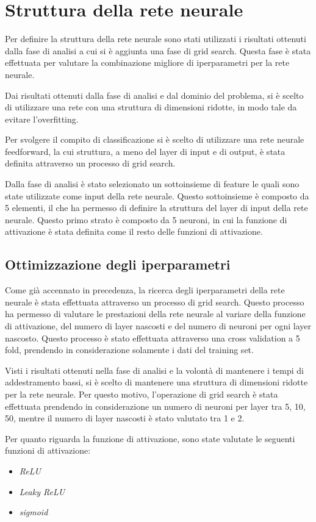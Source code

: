 \section{Struttura della rete neurale}
Per definire la struttura della rete neurale sono stati utilizzati i risultati
ottenuti dalla fase di analisi a cui si è aggiunta una fase di grid search. Questa
fase è stata effettuata per valutare la combinazione migliore di iperparametri
per la rete neurale.

Dai risultati ottenuti dalla fase di analisi e dal dominio del problema, si è
scelto di utilizzare una rete con una struttura di dimensioni ridotte, in modo
tale da evitare l'overfitting.

Per svolgere il compito di classificazione si è scelto di utilizzare una rete
neurale feedforward, la cui struttura, a meno del layer di input e di output, è
stata definita attraverso un processo di grid search.

Dalla fase di analisi è stato selezionato un sottoinsieme di feature le quali
sono state utilizzate come input della rete neurale. Questo sottoinsieme è
composto da 5 elementi, il che ha permesso di definire la struttura del layer di
input della rete neurale. Questo primo strato è composto da 5 neuroni, in cui la
funzione di attivazione è stata definita come il resto delle funzioni di attivazione.
\subsection*{Ottimizzazione degli iperparametri}
Come già accennato in precedenza, la ricerca degli iperparametri della rete neurale
è stata effettuata attraverso un processo di grid search. Questo processo ha
permesso di valutare le prestazioni della rete neurale al variare della funzione
di attivazione, del numero di layer nascosti e del numero di neuroni per ogni
layer nascosto. Questo processo è stato effettuata attraverso una cross
validation a 5 fold, prendendo in considerazione solamente i dati del training set.

Visti i risultati ottenuti nella fase di analisi e la volontà di mantenere i
tempi di addestramento bassi, si è scelto di mantenere una struttura di dimensioni
ridotte per la rete neurale. Per questo motivo, l'operazione di grid search è 
stata effettuata prendendo in considerazione un numero di neuroni per layer 
tra 5, 10, 50, mentre il numero di layer nascosti è stato valutato tra 1 e 2.

Per quanto riguarda la funzione di attivazione, sono state valutate le seguenti 
funzioni di attivazione:
\begin{itemize}
    \item \textit{ReLU}
    \item \textit{Leaky ReLU}
    \item \textit{sigmoid}
\end{itemize}

